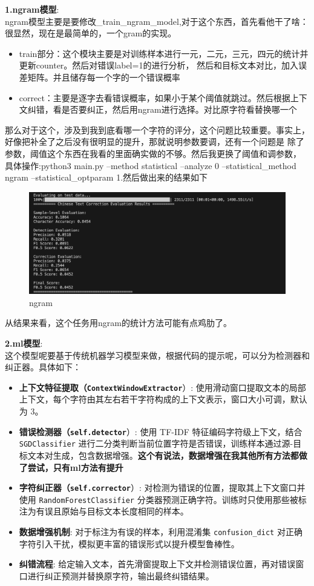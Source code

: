 \documentclass[answers]{exam}  %
\begin{document}
\textbf{1.ngram模型}:\\
ngram模型主要是要修改\_train\_ngram\_model,对于这个东西，首先看他干了啥：很显然，现在是最简单的，一个gram的实现。
\begin{itemize}
    \item train部分：这个模块主要是对训练样本进行一元，二元，三元，四元的统计并更新counter。然后对错误label=1的进行分析，
    然后和目标文本对比，加入误差矩阵。并且储存每一个字的一个错误概率
    \item correct：主要是逐字去看错误概率，如果小于某个阈值就跳过。然后根据上下文纠错，看是否要纠正，然后用ngram进行选择。对比原字符看替换哪一个
\end{itemize}
那么对于这个，涉及到我到底看哪一个字符的评分，这个问题比较重要。事实上，好像把补全了之后没有很明显的提升，那就说明参数要调，还有一个问题是
除了参数，阈值这个东西在我看的里面确实做的不够。然后我更换了阈值和调参数，
具体操作:python3 main.py --method statistical --analyze 0 --statistical\_method ngram --statistical\_optparam 1.然后做出来的结果如下 \\
\begin{figure}[H]
    \centering
    \label{ngram}
    \includegraphics[width=.6\textwidth]{../pic/ngram.png} 
    \caption{ngram}  
\end{figure}

从结果来看，这个任务用ngram的统计方法可能有点鸡肋了。

\medskip

\textbf{2.ml模型}:\\

这个模型呢要基于传统机器学习模型来做，根据代码的提示呢，可以分为检测器和纠正器。具体如下：
\begin{itemize}
    \item \textbf{上下文特征提取（\texttt{ContextWindowExtractor}}）: 使用滑动窗口提取文本的局部上下文，每个字符由其左右若干字符构成的上下文表示，窗口大小可调，默认为 3。
    \item \textbf{错误检测器（\texttt{self.detector}}）: 使用 TF-IDF 特征编码字符级上下文，结合 \texttt{SGDClassifier} 进行二分类判断当前位置字符是否错误，训练样本通过源-目标文本对生成，包含数据增强。\textbf{这个有说法，数据增强在我其他所有方法都做了尝试，只有ml方法有提升}
    \item \textbf{字符纠正器（\texttt{self.corrector}}）: 对检测为错误的位置，提取其上下文窗口并使用 \texttt{RandomForestClassifier} 分类器预测正确字符。训练时只使用那些被标注为有误且原始与目标文本长度相同的样本。
    \item \textbf{数据增强机制}: 对于标注为有误的样本，利用混淆集 \texttt{confusion\_dict} 对正确字符引入干扰，模拟更丰富的错误形式以提升模型鲁棒性。
    \item \textbf{纠错流程}: 给定输入文本，首先滑窗提取上下文并检测错误位置，再对错误窗口进行纠正预测并替换原字符，输出最终纠错结果。
\end{itemize}
\end{document}
